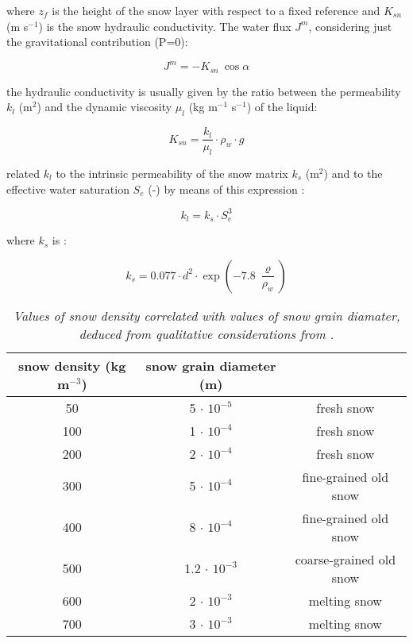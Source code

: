 \noindent where $z_f$ is the height of the snow layer with respect to a fixed reference and $K_{sn}$ (m s$^{-1}$) is the snow hydraulic conductivity. The water flux $J^m$, considering just the gravitational contribution (P=0): 

\begin{equation} \label{eq:J}
J^m =-K_{sn}  \ \cos \alpha
\end{equation}

\noindent the hydraulic conductivity is usually given by the ratio between the permeability $k_l$ (m$^2$) and the dynamic viscosity $\mu_l$ (kg m$^{-1}$ s$^{-1}$) of the liquid:

\begin{equation}
K_{sn}=\frac{k_l}{\mu_l} \cdot \rho_w \cdot g
\end{equation}

\noindent \citet{Colbeck72} related $k_{l}$ to the intrinsic permeability of the snow matrix $k_s$ (m$^2$) and to the effective water saturation $S_e$ (-) by means of this expression \citep{Brooks1964}:

\begin{equation}
k_l=k_s \cdot S_e^3
\end{equation}

\noindent where $k_s$ is \citep{Shimizu70}:

\begin{equation}
k_s=0.077 \cdot d^2 \cdot \exp \left(-7.8 \ \frac{\varrho}{\rho_w}\right)
\end{equation}


\begin{table}[htdp]
\begin{center}
\begin{tabular}{|c|c|c|}
 \hline
   snow density (kg m$^{-3}$) & snow grain diameter (m) & \\
   \hline
	50 & 5 $\cdot$ $10^{-5}$ & fresh snow\\
	100 & 1 $\cdot$ $10^{-4}$ & fresh snow\\
	200 & 2 $\cdot$ $10^{-4}$ & fresh snow\\
	300 & 5 $\cdot$ $10^{-4}$ & fine-grained old snow\\
	400 & 8 $\cdot$ $10^{-4}$ & fine-grained old snow\\
	500 & 1.2 $\cdot$ $10^{-3}$ & coarse-grained old snow\\
	600 & 2 $\cdot$ $10^{-3}$ & melting snow\\
	700 & 3 $\cdot$ $10^{-3}$ & melting snow\\
	\hline
\end{tabular}
\end{center}
\caption{\it{Values of snow density correlated with values of snow grain diamater, deduced from qualitative considerations from \citet{SNTHERM}.  }} \label{grainsize}
\end{table}%


